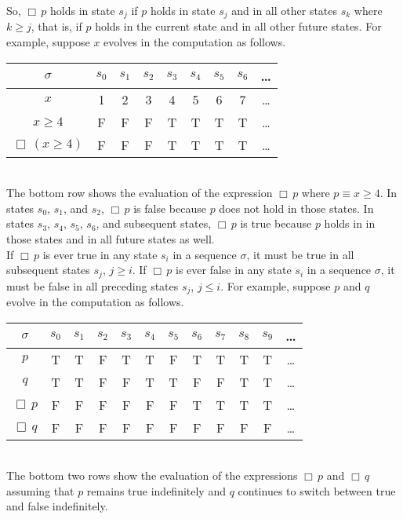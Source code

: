 \documentclass[fleqn, leqno]{article}
\newcommand{\Always}{\Box\,}
\begin{document}
So, $\Always p$ holds in state $s_j$ if $p$ holds in state $s_j$ and in all other states $s_k$ where $k\ge j$,
that is, if $p$ holds in the current state and in all other future states.
For example, suppose $x$ evolves in the computation as follows.\\

\begin{tabular}{c|cccccccc}
$\sigma$ & $s_0$ & $s_1$ & $s_2$ & $s_3$ & $s_4$ & $s_5$ & $s_6$ & \dots \\
\hline
$x$ & 1 & 2 & 3 & 4 & 5 & 6 & 7 & \dots\\
$x \ge 4$ & F & F & F & T & T & T & T & \dots\\
$\Always(x \ge 4)$ & F & F & F & T & T & T & T & \dots\\
\end{tabular}\\

The bottom row shows the evaluation of the expression $\Always p$ where $p\equiv x \ge 4$.
In states $s_0$, $s_1$, and $s_2$, $\Always p$ is false because $p$ does not hold in those states.
In states $s_3$, $s_4$, $s_5$, $s_6$, and subsequent states, $\Always p$ is true because $p$ holds in in those states
and in all future states as well.\\

If $\Always p$ is ever true in any state $s_i$ in a sequence $\sigma$, it must be true in all subsequent states $s_j$, $j\ge i$.
If $\Always p$ is ever false in any state $s_i$ in a sequence $\sigma$, it must be false in all preceding states $s_j$, $j\le i$.
For example, suppose $p$ and $q$ evolve in the computation as follows.\\

\begin{tabular}{c|ccccccccccc}
$\sigma$ & $s_0$ & $s_1$ & $s_2$ & $s_3$ & $s_4$ & $s_5$ & $s_6$ & $s_7$ & $s_8$& $s_9$ & \dots \\
\hline
$p$ & T & T & F & T & T & F & T & T & T & T & \dots\\
$q$ & T & T & F & F & T & T & F & F & T & T & \dots\\
$\Always p$ & F & F & F & F & F & F & T & T & T & T & \dots\\
$\Always q$ & F & F & F & F & F & F & F & F & F & F & \dots\\
\end{tabular}\\

The bottom two rows show the evaluation of the expressions $\Always p$ and $\Always q$
assuming that $p$ remains true indefinitely and $q$ continues to switch between true and false indefinitely.\\
\end{document}
